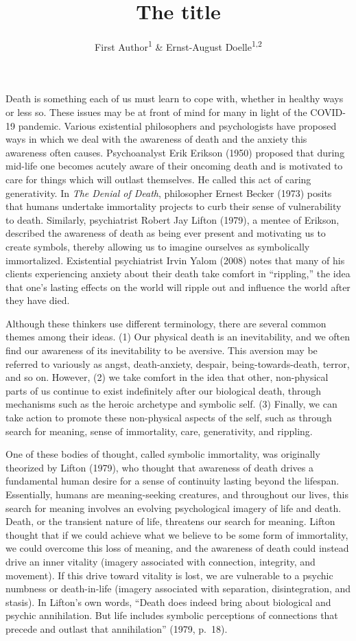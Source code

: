 \documentclass[
  man]{apa6}
\title{The title}
\author{First Author\textsuperscript{1} \& Ernst-August Doelle\textsuperscript{1,2}}
\date{}
\affiliation{\vspace{0.5cm}\textsuperscript{1} Wilhelm-Wundt-University\\\textsuperscript{2} Konstanz Business School}
\begin{document}
\maketitle

Death is something each of us must learn to cope with, whether in
healthy ways or less so. These issues may be at front of mind for many
in light of the COVID-19 pandemic. Various existential philosophers and
psychologists have proposed ways in which we deal with the awareness of
death and the anxiety this awareness often causes. Psychoanalyst Erik
Erikson (1950) proposed that during mid-life one becomes acutely aware
of their oncoming death and is motivated to care for things which will
outlast themselves. He called this act of caring generativity. In \emph{The
Denial of Death}, philosopher Ernest Becker (1973) posits that humans
undertake immortality projects to curb their sense of vulnerability to
death. Similarly, psychiatrist Robert Jay Lifton (1979), a mentee of
Erikson, described the awareness of death as being ever present and
motivating us to create symbols, thereby allowing us to imagine
ourselves as symbolically immortalized. Existential psychiatrist Irvin
Yalom (2008) notes that many of his clients experiencing anxiety about
their death take comfort in ``rippling,'' the idea that one's lasting
effects on the world will ripple out and influence the world after they
have died.

Although these thinkers use different terminology, there are several
common themes among their ideas. (1) Our physical death is an
inevitability, and we often find our awareness of its inevitability to
be aversive. This aversion may be referred to variously as angst,
death-anxiety, despair, being-towards-death, terror, and so on. However,
(2) we take comfort in the idea that other, non-physical parts of us
continue to exist indefinitely after our biological death, through
mechanisms such as the heroic archetype and symbolic self. (3) Finally,
we can take action to promote these non-physical aspects of the self,
such as through search for meaning, sense of immortality, care,
generativity, and rippling.

One of these bodies of thought, called symbolic immortality, was
originally theorized by Lifton (1979), who thought that awareness of
death drives a fundamental human desire for a sense of continuity
lasting beyond the lifespan. Essentially, humans are meaning-seeking
creatures, and throughout our lives, this search for meaning involves an
evolving psychological imagery of life and death. Death, or the
transient nature of life, threatens our search for meaning. Lifton
thought that if we could achieve what we believe to be some form of
immortality, we could overcome this loss of meaning, and the awareness
of death could instead drive an inner vitality (imagery associated with
connection, integrity, and movement). If this drive toward vitality is
lost, we are vulnerable to a psychic numbness or death-in-life (imagery
associated with separation, disintegration, and stasis). In Lifton's own
words, ``Death does indeed bring about biological and psychic
annihilation. But life includes symbolic perceptions of connections that
precede and outlast that annihilation'' (1979, p.~18).
\end{document}
